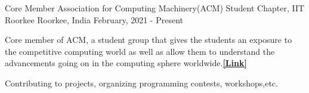 


\begin{cventries}

  \cventry
    {Core Member} %
    {Association for Computing Machinery(ACM) Student Chapter, IIT Roorkee} %
    {Roorkee, India} %
    {February, 2021 - Present} %
    {
      \begin{cvitems} %
        \item {Core member of ACM, a student group that gives the students an exposure to the competitive computing world as well as allow them to understand the advancements going on in the computing sphere worldwide.\href{https://www.iitr.ac.in/acm/index.html\#home}{\bf [Link]}}
        \item {Contributing to projects, organizing programming contests, workshops,etc.}
      \end{cvitems}
    }

\end{cventries}
